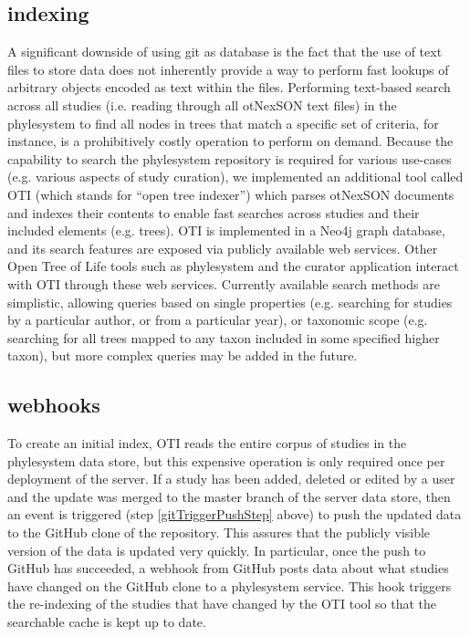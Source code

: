 \documentclass{bioinfo}
\newcommand{\ps}{phylesystem\xspace}
\newcommand{\otol}{Open Tree of Life\xspace}
\newcommand{\nexson}{otNexSON\xspace}
\begin{document}
\begin{methods}
\subsection*{indexing}
A significant downside of using git as database is the fact that the use of text files to store data does not inherently
    provide a way to perform fast lookups of arbitrary objects encoded as text within the files.
Performing text-based search across all studies (i.e. reading through all \nexson text files) in the \ps to find all nodes
    in trees that match a specific set of criteria, for instance, is a prohibitively costly operation to perform on demand.
Because the capability to search the \ps repository is required for various use-cases (e.g. various aspects of
    study curation), we implemented an additional tool called OTI (which stands for ``open tree indexer'') which parses \nexson
    documents and indexes their contents to enable fast searches across studies and their included elements (e.g. trees).
OTI is implemented in a Neo4j graph database, and its search features are exposed via publicly available web services.
Other \otol tools such as \ps and the curator application interact with OTI through these web services.
Currently available search methods are simplistic, allowing queries based on single properties (e.g. searching for studies
    by a particular author, or from a particular year), or taxonomic scope (e.g. searching for all trees mapped to
    any taxon included in some specified higher taxon), but more complex queries may be added in the future.


\subsection*{webhooks}
To create an initial index, OTI reads the entire corpus of studies in the \ps data store, but this expensive operation
    is only required once per deployment of the server.
If a study has been added, deleted or edited by a user and the update was merged to the master branch of the server data store,
    then an event is triggered (step \ref{gitTriggerPushStep} above) to push the updated data to the GitHub clone
    of the repository.
This assures that the publicly visible version of the data is updated very quickly.
In particular, once the push to GitHub has succeeded, a webhook from GitHub posts data about what studies have changed
    on the GitHub clone to a \ps service.
This hook triggers the re-indexing of the studies that have changed by the OTI tool so that the searchable cache is
    kept up to date.


\end{methods}
\end{document}

